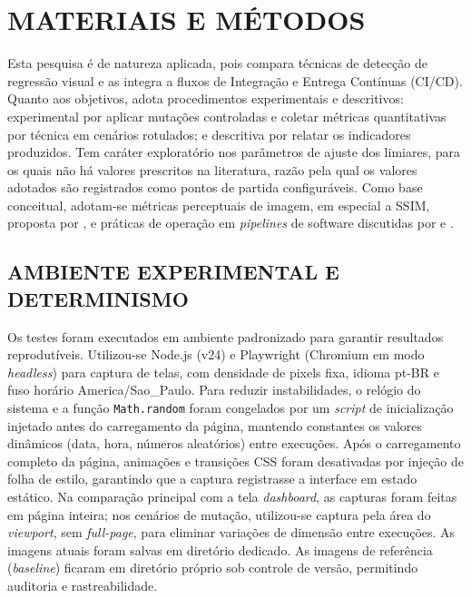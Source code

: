 \documentclass{UNESC}
\begin{document}
\section{MATERIAIS E MÉTODOS}

Esta pesquisa é de natureza aplicada, pois compara técnicas de detecção de regressão visual e as integra a fluxos de Integração e Entrega Contínuas (CI/CD). Quanto aos objetivos, adota procedimentos experimentais e descritivos: experimental por aplicar mutações controladas e coletar métricas quantitativas por técnica em cenários rotulados; e descritiva por relatar os indicadores produzidos. Tem caráter exploratório nos parâmetros de ajuste dos limiares, para os quais não há valores prescritos na literatura, razão pela qual os valores adotados são registrados como pontos de partida configuráveis. Como base conceitual, adotam-se métricas perceptuais de imagem, em especial a SSIM, proposta por , e práticas de operação em \emph{pipelines} de software discutidas por  e .

\subsection{AMBIENTE EXPERIMENTAL E DETERMINISMO}
Os testes foram executados em ambiente padronizado para garantir resultados reprodutíveis. Utilizou-se Node.js (v24) e Playwright (Chromium em modo \emph{headless}) para captura de telas, com densidade de pixels fixa, idioma pt-BR e fuso horário America/Sao\_Paulo. Para reduzir instabilidades, o relógio do sistema e a função \texttt{Math.random} foram congelados por um \emph{script} de inicialização injetado antes do carregamento da página, mantendo constantes os valores dinâmicos (data, hora, números aleatórios) entre execuções. Após o carregamento completo da página, animações e transições CSS foram desativadas por injeção de folha de estilo, garantindo que a captura registrasse a interface em estado estático. Na comparação principal com a tela \emph{dashboard}, as capturas foram feitas em página inteira; nos cenários de mutação, utilizou-se captura pela área do \emph{viewport}, sem \emph{full-page}, para eliminar variações de dimensão entre execuções. As imagens atuais foram salvas em diretório dedicado. As imagens de referência (\emph{baseline}) ficaram em diretório próprio sob controle de versão, permitindo auditoria e rastreabilidade.
\end{document}
